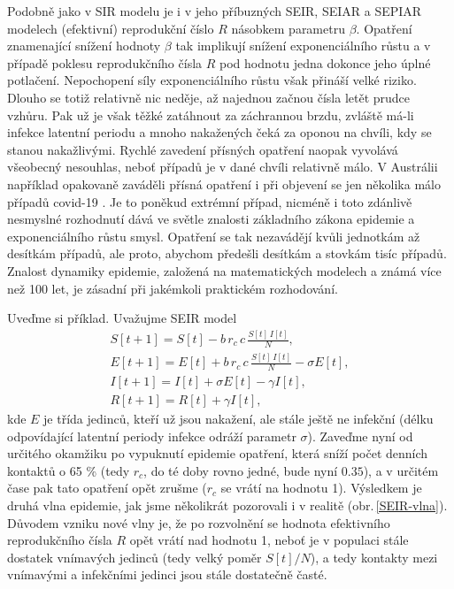 Podobně jako v SIR modelu je i v jeho příbuzných SEIR, SEIAR a SEPIAR modelech (efektivní) reprodukční číslo $R$ násobkem parametru $\beta$. Opatření znamenající snížení hodnoty $\beta$ tak implikují snížení exponenciálního růstu a v případě poklesu reprodukčního čísla $R$ pod hodnotu jedna dokonce jeho úplné potlačení. Nepochopení síly exponenciálního růstu však přináší velké riziko. Dlouho se totiž relativně nic neděje, až najednou začnou čísla letět prudce vzhůru. Pak už je však těžké zatáhnout za záchrannou brzdu, zvláště má-li infekce latentní periodu a mnoho nakažených čeká za oponou na chvíli, kdy se stanou nakažlivými. Rychlé zavedení přísných opatření naopak vyvolává všeobecný nesouhlas, neboť případů je v dané chvíli relativně málo. V Austrálii například opakovaně zaváděli přísná opatření i při objevení se jen několika málo případů covid-19 \cite{australia_opatreni}. Je to poněkud extrémní případ, nicméně i toto zdánlivě nesmyslné rozhodnutí dává ve světle znalosti základního zákona epidemie a exponenciálního růstu smysl. Opatření se tak nezavádějí kvůli jednotkám až desítkám případů, ale proto, abychom předešli desítkám a stovkám tisíc případů. Znalost dynamiky epidemie, založená na matematických modelech a známá více než 100 let, je zásadní při jakémkoli praktickém rozhodování.

Uveďme si příklad. Uvažujme SEIR model
\begin{equation}
	\begin{array}{l}
		\displaystyle{S[t+1] = S[t] - b\,r_c\,c \, \frac{S[t]\,I[t]}{N}}, \\[3ex]
		\displaystyle{E[t+1] = E[t] + b\,r_c\,c \, \frac{S[t]\,I[t]}{N} - \sigma E[t]}, \\[3ex]
		\displaystyle{I[t+1] = I[t] + \sigma E[t] - \gamma I[t]}, \\[3ex]
		\displaystyle{R[t+1] = R[t] + \gamma I[t]},
	\end{array}
	\label{SEIR1}
\end{equation}
kde $E$ je třída jedinců, kteří už jsou nakažení, ale stále ještě ne infekční (délku odpovídající latentní periody infekce odráží parametr $\sigma$). Zaveďme nyní od určitého okamžiku po vypuknutí epidemie opatření, která sníží počet denních kontaktů o 65 \% (tedy $r_c$, do té doby rovno jedné, bude nyní $0.35$), a v určitém čase pak tato opatření opět zrušme ($r_c$ se vrátí na hodnotu 1). Výsledkem je druhá vlna epidemie, jak jsme několikrát pozorovali i v realitě (obr.\,\ref{SEIR-vlna}). Důvodem vzniku nové vlny je, že po rozvolnění se hodnota efektivního reprodukčního čísla $R$ opět vrátí nad hodnotu 1, neboť je v populaci stále dostatek vnímavých jedinců (tedy velký poměr $S[t]/N$), a tedy kontakty mezi vnímavými a infekčními jedinci jsou stále dostatečně časté.

